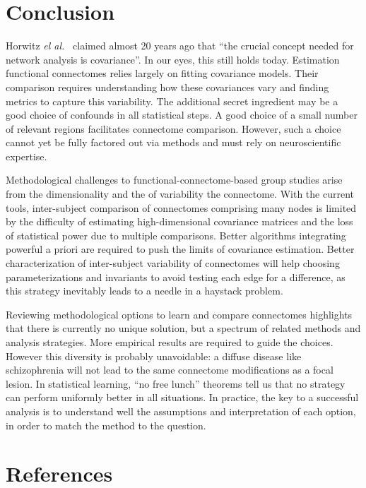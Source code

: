 \documentclass[5p]{elsarticle}
\begin{document}

\section{Conclusion}

Horwitz \emph{el al.}\ \cite{horwitz1995} claimed almost 20 years ago
that ``the crucial concept needed for network analysis is covariance''.
In our eyes, this still holds today. Estimation functional connectomes
relies largely on fitting covariance models. Their comparison requires
understanding how these covariances vary and finding metrics to capture
this variability. The additional secret ingredient may be a good choice
of confounds in all statistical steps. A good choice of a small number of
relevant regions facilitates connectome comparison. However, such a
choice cannot yet be fully factored out via methods and must rely on
neuroscientific expertise.

Methodological challenges to functional-connectome-based group studies
arise from the dimensionality and the of variability the connectome. With
the current tools, inter-subject comparison of connectomes comprising
many nodes is limited by the difficulty of estimating high-dimensional
covariance matrices and the loss of statistical power due to multiple
comparisons. Better algorithms integrating powerful a priori are required
to push the limits of covariance estimation. Better characterization of
inter-subject variability of connectomes \cite{kelly2012} will help
choosing parameterizations and invariants to avoid testing each edge for
a difference, as this strategy inevitably leads to a needle in a haystack
problem.

Reviewing methodological options to learn and compare connectomes
highlights that there is currently no unique solution, but a spectrum of
related methods and analysis strategies. More empirical results are
required to guide the choices. However this diversity is probably
unavoidable: a diffuse disease like schizophrenia will not lead to the
same connectome modifications as a focal lesion. In statistical learning,
``no free lunch'' theorems \cite{wolpert1996} tell us that no strategy
can perform uniformly better in all situations. In practice, the key to a
successful analysis is to understand well the assumptions and
interpretation of each option, in order to match the method to the
question.

{
\section*{References} \small 
 }

\end{document}
